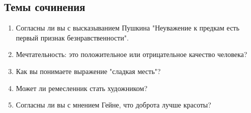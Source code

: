 \documentclass{article}
\begin{document}
\subsection{Темы сочинения}

\begin{enumerate}
\item
  Согласны ли вы с высказыванием Пушкина "Неуважение к предкам есть первый признак безнравственности".
\item
  Мечтательность: это положительное или отрицательное качество человека?
\item
  Как вы понимаете выражение "сладкая месть"?
\item
  Может ли ремесленник стать художником?
\item
  Согласны ли вы с мнением Гейне, что доброта лучше красоты?
\end{enumerate}
\end{document}
